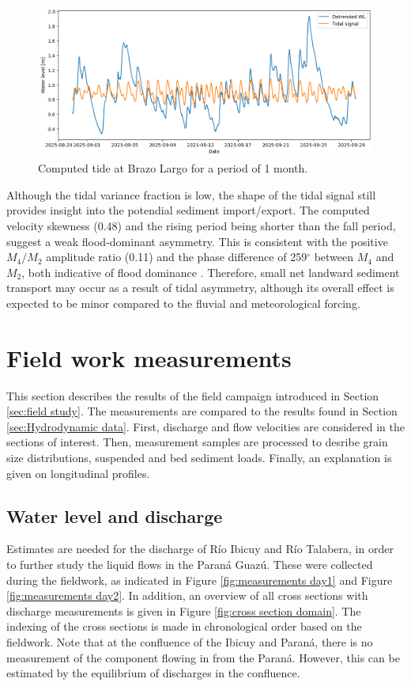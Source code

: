 \begin{figure}[H]
    \centering
    \includegraphics[width=1\linewidth]{figures/ch6/Tide_BL_1month.png}
    \caption{Computed tide at Brazo Largo for a period of 1 month.}
    \label{fig: Tide 1 month Brazo Largo}
\end{figure}

Although the tidal variance fraction is low, the shape of the tidal signal still provides insight into the potendial sediment import/export. The computed velocity skewness (0.48) and the rising period being shorter than the fall period, suggest a weak flood-dominant asymmetry. This is consistent with the positive $M_4/M_2$ amplitude ratio (0.11) and the phase difference of 259$^\circ$ between $M_4$ and $M_2$, both indicative of flood dominance \autocite{bosboomCoastalDynamics2023}. Therefore, small net landward sediment transport may occur as a result of tidal asymmetry, although its overall effect is expected to be minor compared to the fluvial and meteorological forcing.


\newpage
\section{Field work measurements}
This section describes the results of the field campaign introduced in Section \ref{sec:field study}. The measurements are compared to the results found in Section \ref{sec:Hydrodynamic data}.
First, discharge and flow velocities are considered in the sections of interest. Then, measurement samples are processed to desribe grain size distributions, suspended and bed sediment loads. Finally, an explanation is given on longitudinal profiles.

\subsection{Water level and discharge}
Estimates are needed for the discharge of Río Ibicuy and Río Talabera, in order to further study the liquid flows in the Paraná Guazú. These were collected during the fieldwork, as indicated in Figure \ref{fig:measurements day1} and Figure \ref{fig:measurements day2}. In addition, an overview of all cross sections with discharge measurements is given in Figure \ref{fig:cross section domain}. The indexing of the cross sections is made in chronological order based on the fieldwork. Note that at the confluence of the Ibicuy and Paraná, there is no measurement of the component flowing in from the Paraná. However, this can be estimated by the equilibrium of discharges in the confluence. 

